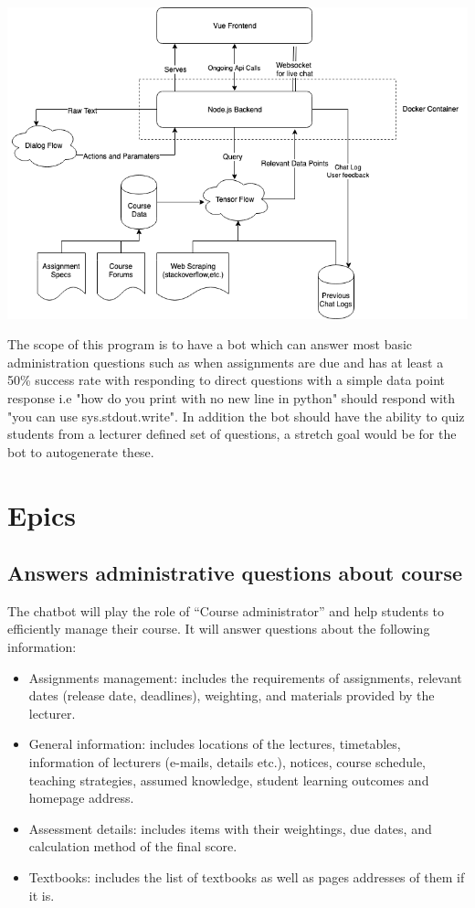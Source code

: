 \documentclass{article}
\begin{document}
\includegraphics[width=\textwidth]{architecture_diagram.png}

The scope of this program is to have a bot which can answer most basic administration questions such as when assignments are due and has at least a 50\% success rate with responding to direct questions with a simple data point response i.e "how do you print with no new line in python" should respond with "you can use sys.stdout.write". In addition the bot should have the ability to quiz students from a lecturer defined set of questions, a stretch goal would be for the bot to autogenerate these.


\section{Epics}

\subsection{Answers administrative questions about course}

The chatbot will play the role of “Course administrator” and help students to efficiently manage their course. It will answer questions about the following information:
\begin{itemize}
  \item Assignments management: includes the requirements of assignments, relevant dates (release date, deadlines), weighting, and materials provided by the lecturer.
  \item General information: includes locations of the lectures, timetables, information of lecturers (e-mails, details etc.), notices, course schedule, teaching strategies, assumed knowledge, student learning outcomes and homepage address.
  \item Assessment details: includes items with their weightings, due dates, and calculation method of the final score.
  \item Textbooks: includes the list of textbooks as well as pages addresses of them if it is.
\end{itemize}
\end{document}
